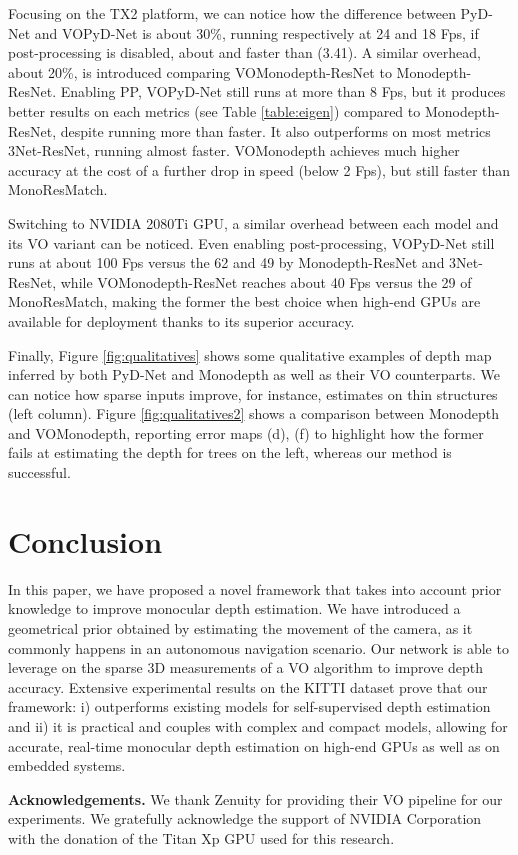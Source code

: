 \documentclass[10pt,twocolumn,letterpaper]{article}
\begin{document}
Focusing on the TX2 platform, we can notice how the difference between PyD-Net and VOPyD-Net is about 30\%, running respectively at 24 and 18 Fps, if post-processing is disabled, about  and  faster than \cite{Godard1} (3.41). A similar overhead, about 20\%, is introduced comparing VOMonodepth-ResNet to Monodepth-ResNet.
Enabling PP, VOPyD-Net still runs at more than 8 Fps, but it produces better results on each metrics (see Table \ref{table:eigen}) compared to Monodepth-ResNet, despite running more than  faster. It also outperforms on most metrics 3Net-ResNet, running almost  faster. VOMonodepth achieves much higher accuracy at the cost of a further drop in speed (below 2 Fps), but still  faster than MonoResMatch. 

Switching to NVIDIA 2080Ti GPU, a similar overhead between each model and its VO variant can be noticed. Even enabling post-processing, VOPyD-Net still runs at about 100 Fps versus the 62 and 49  by Monodepth-ResNet and 3Net-ResNet, while VOMonodepth-ResNet reaches about 40 Fps versus the 29 of MonoResMatch, making the former the best choice when high-end GPUs are available for deployment thanks to its superior accuracy.

Finally, Figure \ref{fig:qualitatives} shows some qualitative examples of depth map inferred by both PyD-Net and Monodepth as well as their VO counterparts. We can notice how sparse inputs improve, for instance, estimates on thin structures (left column). Figure \ref{fig:qualitatives2} shows a comparison between Monodepth \cite{Godard1} and VOMonodepth, reporting error maps (d), (f) to highlight how the former fails at estimating the depth for trees on the left, whereas our method is successful. \section{Conclusion}
\label{conclusions}

In this paper, we have proposed a novel framework that takes into account prior knowledge to improve monocular depth estimation. We have introduced a geometrical prior obtained by estimating the movement of the camera, as it commonly happens in an autonomous navigation scenario. Our network is able to leverage on the sparse 3D measurements of a VO algorithm to improve depth accuracy.
Extensive experimental results on the KITTI dataset prove that our framework: i) outperforms existing models for self-supervised depth estimation and ii) it is practical and couples with complex and compact models, allowing for accurate, real-time monocular depth estimation on high-end GPUs as well as on embedded systems.
 
\textbf{Acknowledgements.} We thank Zenuity for providing their VO pipeline for our experiments. We gratefully acknowledge the support of NVIDIA Corporation with the donation of the Titan Xp GPU used for this research. 

{\small


}
\end{document}
